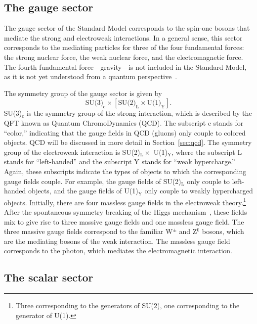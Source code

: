 \subsection{The gauge sector}
\label{sec:gauge_fields}

The gauge sector of the Standard Model corresponds to the spin-one bosons that mediate the strong and electroweak interactions. In a general sense, this sector corresponds to the mediating particles for three of the four fundamental forces: the strong nuclear force, the weak nuclear force, and the electromagnetic force. The fourth fundamental force---gravity---is not included in the Standard Model, as it is not yet understood from a quantum perspective~\cite{QuantumGravity}.

The symmetry group of the gauge sector is given by
%
\begin{equation}
    \label{eq:gauge_symmetry}
    \text{SU(3)}_\text{c} \times \left[\text{SU(2)}_\text{L} \times \text{U(1)}_\text{Y}\right].
\end{equation}
%
SU(3)$_\text{c}$ is the symmetry group of the strong interaction, which is described by the QFT known as Quantum ChromoDynamics (QCD). The subscript c stands for ``color,'' indicating that the gauge fields in QCD (gluons) only couple to colored objects. QCD will be discussed in more detail in Section~\ref{sec:qcd}. The symmetry group of the electroweak interaction is SU(2)$_\text{L} \times$ U(1)$_\text{Y}$, where the subscript L stands for ``left-handed'' and the subscript Y stands for ``weak hypercharge.'' Again, these subscripts indicate the types of objects to which the corresponding gauge fields couple. For example, the gauge fields of SU(2)$_\text{L}$ only couple to left-handed objects, and the gauge fields of U(1)$_\text{Y}$ only couple to weakly hypercharged objects. Initially, there are four massless gauge fields in the electroweak theory.\footnote{Three corresponding to the generators of SU(2), one corresponding to the generator of U(1).} After the spontaneous symmetry breaking of the Higgs mechanism~\cite{HiggsPaper}, these fields mix to give rise to three massive gauge fields and one massless gauge field. The three massive gauge fields correspond to the familiar W$^{\pm}$ and Z$^{0}$ bosons, which are the mediating bosons of the weak interaction. The massless gauge field corresponds to the photon, which mediates the electromagnetic interaction.

\subsection{The scalar sector}
\label{sec:scalar_fields}

